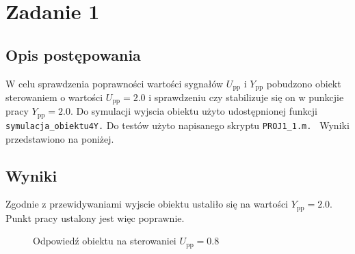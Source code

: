 \chapter{Zadanie 1}
\label{zad1}

\section{Opis postępowania}
\label{zad1_opis}
W celu sprawdzenia poprawności wartości sygnałów $U_{\mathrm{pp}}$ i $Y_{\mathrm{pp}}$ pobudzono obiekt sterowaniem
o wartości $U_{\mathrm{pp}}= \num{2.0}$ i sprawdzeniu czy stabilizuje się on w punkcjie pracy  $Y_{\mathrm{pp}}= \num{2.0}$. Do symulacji wyjscia obiektu użyto udostępnionej funkcji 
\verb+symulacja_obiektu4Y.+ Do testów użyto napisanego skryptu \verb+PROJ1_1.m. + Wyniki przedstawiono na poniżej.

\section{Wyniki}
\label{zad1_wyniki}
Zgodnie z przewidywaniami wyjscie obiektu ustaliło się na wartości $Y_{\mathrm{pp}}= \num{2.0}$. Punkt pracy ustalony jest więc poprawnie.
\begin{figure}[b]

    \label{zad1_1_wykres}
    \centering
    \caption{Odpowiedź obiektu na sterowaniei $U_{\mathrm{pp}}=\num{0.8}$}
\end{figure}